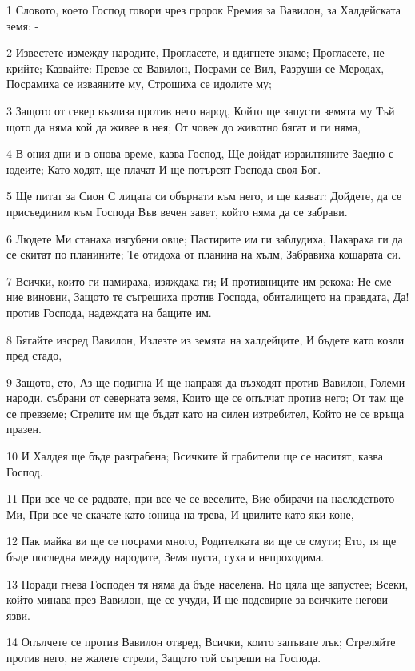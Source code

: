 \par 1 Словото, което Господ говори чрез пророк Еремия за Вавилон, за Халдейската земя: -
\par 2 Известете измежду народите, Прогласете, и вдигнете знаме; Прогласете, не крийте; Казвайте: Превзе се Вавилон, Посрами се Вил, Разруши се Меродах, Посрамиха се изваяните му, Строшиха се идолите му;
\par 3 Защото от север възлиза против него народ, Който ще запусти земята му Тъй щото да няма кой да живее в нея; От човек до животно бягат и ги няма,
\par 4 В ония дни и в онова време, казва Господ, Ще дойдат израилтяните Заедно с юдеите; Като ходят, ще плачат И ще потърсят Господа своя Бог.
\par 5 Ще питат за Сион С лицата си обърнати към него, и ще казват: Дойдете, да се присъединим към Господа Във вечен завет, който няма да се забрави.
\par 6 Людете Ми станаха изгубени овце; Пастирите им ги заблудиха, Накараха ги да се скитат по планините; Те отидоха от планина на хълм, Забравиха кошарата си.
\par 7 Всички, които ги намираха, изяждаха ги; И противниците им рекоха: Не сме ние виновни, Защото те съгрешиха против Господа, обиталището на правдата, Да! против Господа, надеждата на бащите им.
\par 8 Бягайте изсред Вавилон, Излезте из земята на халдейците, И бъдете като козли пред стадо,
\par 9 Защото, ето, Аз ще подигна И ще направя да възходят против Вавилон, Големи народи, събрани от северната земя, Които ще се опълчат против него; От там ще се превземе; Стрелите им ще бъдат като на силен изтребител, Който не се връща празен.
\par 10 И Халдея ще бъде разграбена; Всичките й грабители ще се наситят, казва Господ.
\par 11 При все че се радвате, при все че се веселите, Вие обирачи на наследството Ми, При все че скачате като юница на трева, И цвилите като яки коне,
\par 12 Пак майка ви ще се посрами много, Родителката ви ще се смути; Ето, тя ще бъде последна между народите, Земя пуста, суха и непроходима.
\par 13 Поради гнева Господен тя няма да бъде населена. Но цяла ще запустее; Всеки, който минава през Вавилон, ще се учуди, И ще подсвирне за всичките негови язви.
\par 14 Опълчете се против Вавилон отвред, Всички, които запъвате лък; Стреляйте против него, не жалете стрели, Защото той съгреши на Господа.
